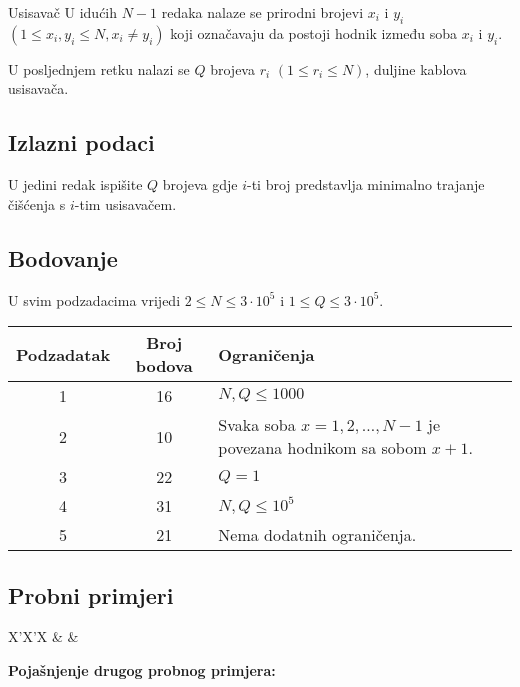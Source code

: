 \begin{statement}[
  problempoints=100,
  timelimit=1 sekunda,
  memorylimit=512 MiB,
]{Usisavač}
U idućih $N - 1$ redaka nalaze se prirodni brojevi $x_i$ i $y_i$ $(1 \le x_i, y_i \le N, x_i \ne y_i)$ koji označavaju da postoji hodnik između soba $x_i$ i $y_i$.

U posljednjem retku nalazi se $Q$ brojeva $r_i$ $(1 \le r_i \le N)$, duljine kablova usisavača.

\subsection*{Izlazni podaci}

U jedini redak ispišite $Q$ brojeva gdje $i$-ti broj predstavlja minimalno trajanje čišćenja s $i$-tim usisavačem.

\subsection*{Bodovanje}

U svim podzadacima vrijedi $2 \le N \le 3 \cdot 10^5$ i $1 \le Q \le 3 \cdot 10^5$.

{\renewcommand{\arraystretch}{1.4}
  \setlength{\tabcolsep}{6pt}
  \begin{tabular}{ccl}
   Podzadatak & Broj bodova & Ograničenja \\ \midrule
   	1 & 16 & $N, Q \le 1000$ \\
    2 & 10 & Svaka soba $x = 1, 2, \dots, N - 1$ je povezana hodnikom sa sobom $x + 1$. \\
    3 & 22 & $Q = 1$ \\
    4 & 31 & $N, Q \leq 10^5$ \\
    5 & 21 & Nema dodatnih ograničenja. \\
\end{tabular}}

\subsection*{Probni primjeri}
\begin{tabularx}{\textwidth}{X'X'X}
 &
 &
\end{tabularx}

\textbf{Pojašnjenje drugog probnog primjera:}\\


\end{statement}

